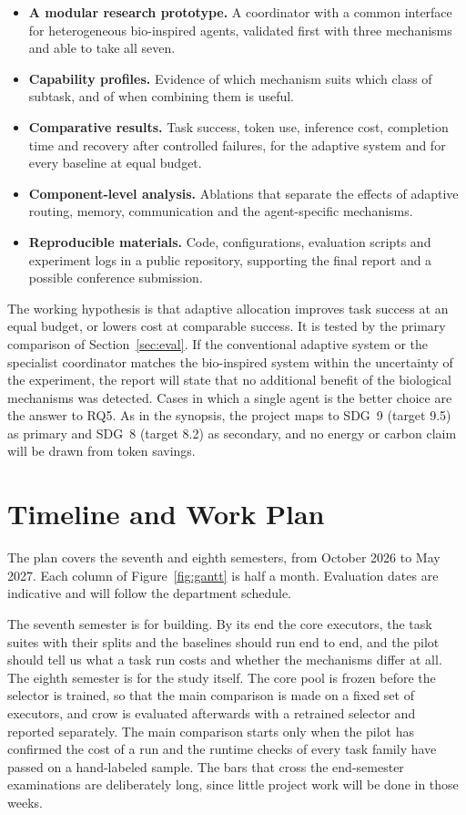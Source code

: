 \documentclass[11pt,a4paper]{article}
\begin{document}
\begin{itemize}
  \item \textbf{A modular research prototype.} A coordinator with a common interface for heterogeneous
        bio-inspired agents, validated first with three mechanisms and able to take all seven.
  \item \textbf{Capability profiles.} Evidence of which mechanism suits which class of subtask, and of
        when combining them is useful.
  \item \textbf{Comparative results.} Task success, token use, inference cost, completion time and recovery
        after controlled failures, for the adaptive system and for every baseline at equal budget.
  \item \textbf{Component-level analysis.} Ablations that separate the effects of adaptive routing, memory,
        communication and the agent-specific mechanisms.
  \item \textbf{Reproducible materials.} Code, configurations, evaluation scripts and experiment logs in a
        public repository, supporting the final report and a possible conference submission.
\end{itemize}

The working hypothesis is that adaptive allocation improves task success at an equal budget, or lowers cost
at comparable success. It is tested by the primary comparison of Section~\ref{sec:eval}. If the
conventional adaptive system or the specialist coordinator matches the bio-inspired system within the
uncertainty of the experiment, the report will state that no additional benefit of the biological
mechanisms was detected. Cases in which a single agent is the better choice are the answer to RQ5. As in
the synopsis, the project maps to SDG~9 (target 9.5) as primary and SDG~8 (target 8.2) as secondary, and no
energy or carbon claim will be drawn from token savings.

\section{Timeline and Work Plan}

The plan covers the seventh and eighth semesters, from October 2026 to May 2027. Each column of
Figure~\ref{fig:gantt} is half a month. Evaluation dates are indicative and will follow the department
schedule.

The seventh semester is for building. By its end the core executors, the task suites with their splits and
the baselines should run end to end, and the pilot should tell us what a task run costs and whether the
mechanisms differ at all. The eighth semester is for the study itself. The core pool is frozen before the
selector is trained, so that the main comparison is made on a fixed set of executors, and crow is evaluated
afterwards with a retrained selector and reported separately. The main comparison starts only when the
pilot has confirmed the cost of a run and the runtime checks of every task family have passed on a
hand-labeled sample. The bars that cross the end-semester examinations are deliberately long, since little
project work will be done in those weeks.
\end{document}
